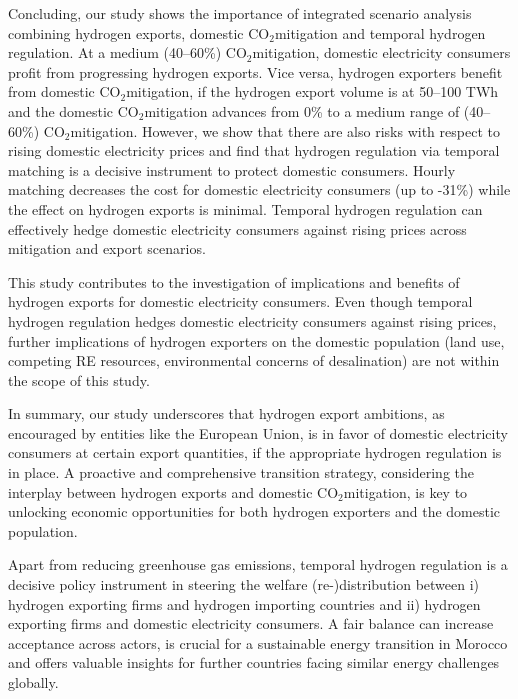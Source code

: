 \documentclass[5p,numafflabel]{elsarticle}
\newcommand{\co}{\ce{CO2}~}
\def\co{CO${}_2${\:}}
\begin{document}
\label{sec:conclusion}



Concluding, our study shows the importance of integrated scenario analysis combining hydrogen exports, domestic \co mitigation and temporal hydrogen regulation.
At a medium (40--60\%) \co mitigation, domestic electricity consumers profit from progressing hydrogen exports. Vice versa, hydrogen exporters benefit from domestic \co mitigation, if the hydrogen export volume is at 50--100 TWh and the domestic \co mitigation advances from 0\% to a medium range of (40--60\%) \co mitigation. However, we show that there are also risks with respect to rising domestic electricity prices
and find that hydrogen regulation via temporal matching is a decisive instrument
to protect domestic consumers. Hourly matching decreases the cost for domestic electricity consumers (up to -31\%) while the effect on hydrogen exports is minimal. Temporal hydrogen regulation can effectively hedge domestic electricity consumers against rising prices across mitigation and export scenarios.

This study contributes to the investigation of implications and benefits of hydrogen exports for domestic electricity consumers. Even though temporal hydrogen regulation hedges domestic electricity consumers against rising prices, further implications of hydrogen exporters on the domestic population (land use, competing RE resources, environmental concerns of desalination) are not within the scope of this study.

In summary, our study underscores that hydrogen export ambitions, as encouraged by entities like the European Union, is in favor of domestic electricity consumers at certain export quantities, if the appropriate hydrogen regulation is in place. A proactive and comprehensive transition strategy, considering the interplay between hydrogen exports and domestic \co mitigation, is key to unlocking economic opportunities for both hydrogen exporters and the domestic population. 


Apart from reducing greenhouse gas emissions, temporal hydrogen regulation is a decisive policy instrument in steering the welfare (re-)distribution between i) hydrogen exporting firms and hydrogen importing countries and ii) hydrogen exporting firms and domestic electricity consumers. 
A fair balance can increase acceptance across actors, is crucial for a sustainable energy transition in Morocco and offers valuable insights for further countries facing similar energy challenges globally.
\end{document}
